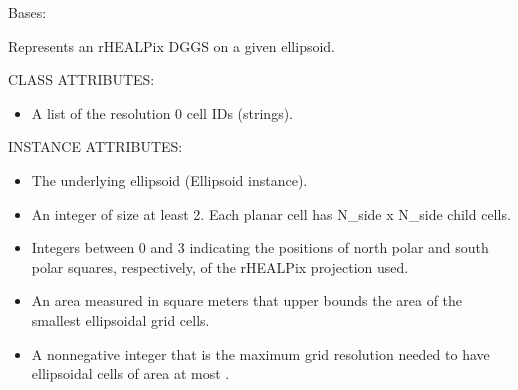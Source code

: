 \documentclass[a4paper,12ptopenany,oneside,english]{sphinxmanual}
\begin{document}

\begin{fulllineitems}
\label{\detokenize{dggs:rhealpixdggs.dggs.RHEALPixDGGS}}
\pysigstartsignatures
{}
\pysigstopsignatures
\sphinxAtStartPar
Bases: 

\sphinxAtStartPar
Represents an rHEALPix DGGS on a given ellipsoid.

\sphinxAtStartPar
CLASS ATTRIBUTES:
\begin{itemize}
\item {} 
\sphinxAtStartPar
{} \sphinxhyphen{} A list of the resolution 0 cell IDs (strings).

\end{itemize}

\sphinxAtStartPar
INSTANCE ATTRIBUTES:
\begin{itemize}
\item {} 
\sphinxAtStartPar
{} \sphinxhyphen{} The underlying ellipsoid (Ellipsoid instance).

\item {} 
\sphinxAtStartPar
{} \sphinxhyphen{} An integer of size at least 2.
Each planar cell has N\_side x N\_side child cells.

\item {} 
\sphinxAtStartPar
{} \sphinxhyphen{} Integers between 0 and 3 indicating
the positions of north polar and south polar squares, respectively,
of the rHEALPix projection used.

\item {} 
\sphinxAtStartPar
{} \sphinxhyphen{} An area measured in square meters that
upper bounds the area of the smallest ellipsoidal grid cells.

\item {} 
\sphinxAtStartPar
{} \sphinxhyphen{} A nonnegative integer that is the maximum grid
resolution needed to have ellipsoidal cells of area at most
.


\end{itemize}
\end{fulllineitems}
\end{document}
